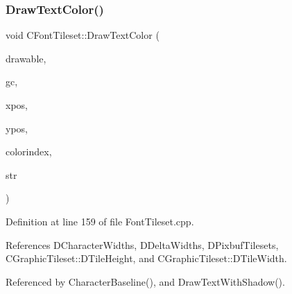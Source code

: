 \subsubsection{\texorpdfstring{Draw\+Text\+Color()}{DrawTextColor()}}
{\footnotesize\ttfamily void C\+Font\+Tileset\+::\+Draw\+Text\+Color (\begin{DoxyParamCaption}\item[{Gdk\+Drawable $\ast$}]{drawable,  }\item[{Gdk\+GC $\ast$}]{gc,  }\item[{gint}]{xpos,  }\item[{gint}]{ypos,  }\item[{int}]{colorindex,  }\item[{const std\+::string \&}]{str }\end{DoxyParamCaption})}



Definition at line 159 of file Font\+Tileset.\+cpp.



References D\+Character\+Widths, D\+Delta\+Widths, D\+Pixbuf\+Tilesets, C\+Graphic\+Tileset\+::\+D\+Tile\+Height, and C\+Graphic\+Tileset\+::\+D\+Tile\+Width.



Referenced by Character\+Baseline(), and Draw\+Text\+With\+Shadow().


